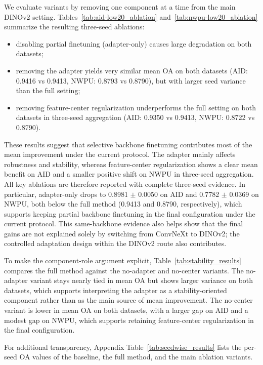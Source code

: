 We evaluate variants by removing one component at a time from the main DINOv2 setting. Tables~\ref{tab:aid-low20_ablation} and~\ref{tab:nwpu-low20_ablation} summarize the resulting three-seed ablations:
\begin{itemize}[leftmargin=1.5em]
  \item disabling partial finetuning (adapter-only) causes large degradation on both datasets;
  \item removing the adapter yields very similar mean OA on both datasets (AID: 0.9416 vs 0.9413, NWPU: 0.8793 vs 0.8790), but with larger seed variance than the full setting;
  \item removing feature-center regularization underperforms the full setting on both datasets in three-seed aggregation (AID: 0.9350 vs 0.9413, NWPU: 0.8722 vs 0.8790).
\end{itemize}
These results suggest that selective backbone finetuning contributes most of the mean improvement under the current protocol. The adapter mainly affects robustness and stability, whereas feature-center regularization shows a clear mean benefit on AID and a smaller positive shift on NWPU in three-seed aggregation. All key ablations are therefore reported with complete three-seed evidence. In particular, adapter-only drops to 0.8981 $\pm$ 0.0050 on AID and 0.7782 $\pm$ 0.0369 on NWPU, both below the full method (0.9413 and 0.8790, respectively), which supports keeping partial backbone finetuning in the final configuration under the current protocol. This same-backbone evidence also helps show that the final gains are not explained solely by switching from ConvNeXt to DINOv2; the controlled adaptation design within the DINOv2 route also contributes.



To make the component-role argument explicit, Table~\ref{tab:stability_results} compares the full method against the no-adapter and no-center variants. The no-adapter variant stays nearly tied in mean OA but shows larger variance on both datasets, which supports interpreting the adapter as a stability-oriented component rather than as the main source of mean improvement. The no-center variant is lower in mean OA on both datasets, with a larger gap on AID and a modest gap on NWPU, which supports retaining feature-center regularization in the final configuration.



For additional transparency, Appendix Table~\ref{tab:seedwise_results} lists the per-seed OA values of the baseline, the full method, and the main ablation variants.

